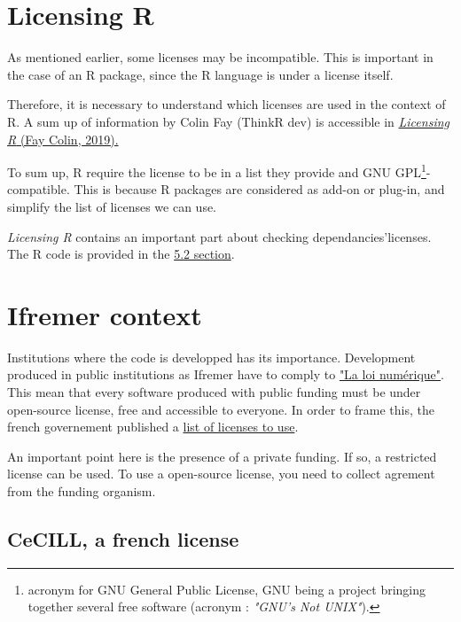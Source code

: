 \documentclass[12pt, colorinlistoftodos]{article}
\begin{document}
\section{Licensing R}

As mentioned earlier, some licenses may be incompatible.
This is important in the case of an R package, since the R language is under a license itself.

Therefore, it is necessary to understand which licenses are used in the context of R.
A sum up of information by Colin Fay (ThinkR dev) is accessible in \href{https://thinkr-open.github.io/licensing-r/}{\textit{Licensing R} (Fay Colin, 2019).}

To sum up, R require the license to be in a list they provide and GNU GPL\footnote{acronym for GNU General Public License, GNU being a project bringing together several free software (acronym : \textit{"GNU’s Not UNIX"}).}-compatible.
This is because R packages are considered as add-on or plug-in, and simplify the list of licenses we can use.

\textit{Licensing R} contains an important part about checking dependancies'licenses. 
The R code is provided in the \href{https://thinkr-open.github.io/licensing-r/practical.html#dependencies-exploration}{5.2 section}.

\section{Ifremer context}

Institutions where the code is developped has its importance.
Development produced in public institutions as Ifremer have to comply to 
\href{https://www.legifrance.gouv.fr/loda/article_lc/LEGIARTI000033205142/2020-09-21/}{"La loi numérique"}. 
This mean that every software produced with public funding must be 
under open-source license, free and accessible to everyone.
In order to frame this, the french governement published a \href{https://www.data.gouv.fr/fr/pages/legal/licences/}{list of licenses to use}.

An important point here is the presence of a private funding. 
If so, a restricted license can be used. 
To use a open-source license, you need to collect agrement from the funding organism.

\subsection*{CeCILL, a french license}
\end{document}
